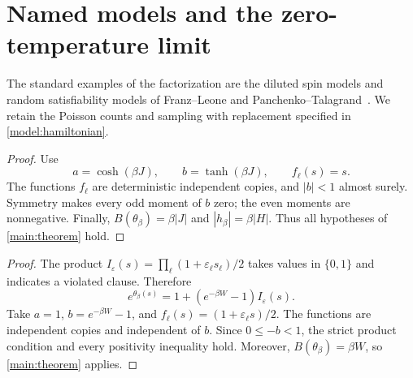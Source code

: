 \section{Named models and the zero-temperature limit}
\label{models:section}

The standard examples of the factorization are the diluted spin models
and random satisfiability models of
Franz--Leone and Panchenko--Talagrand~\cite{FL03,PT04}.
We retain the Poisson counts and sampling with replacement specified
in \eqref{model:hamiltonian}.


\begin{proof}
Use
\[
 a=\cosh(\beta J),\qquad b=\tanh(\beta J),\qquad f_\ell(s)=s.
\]
The functions $f_\ell$ are deterministic independent copies, and
$|b|<1$ almost surely. Symmetry makes every odd moment of $b$ zero;
the even moments are nonnegative. Finally,
$B(\theta_\beta)=\beta|J|$ and $|h_\beta|=\beta|H|$.
Thus all hypotheses of \cref{main:theorem} hold.
\end{proof}


\begin{proof}
The product
$I_\varepsilon(s)=\prod_\ell(1+\varepsilon_\ell s_\ell)/2$ takes
values in $\{0,1\}$ and indicates a violated clause. Therefore
\[
 e^{\theta_\beta(s)}
 =1+(e^{-\beta W}-1)I_\varepsilon(s).
\]
Take $a=1$, $b=e^{-\beta W}-1$, and
$f_\ell(s)=(1+\varepsilon_\ell s)/2$. The functions are independent
copies and independent of $b$. Since $0\le-b<1$, the strict product
condition and every positivity inequality hold. Moreover,
$B(\theta_\beta)=\beta W$, so \cref{main:theorem} applies.
\end{proof}

